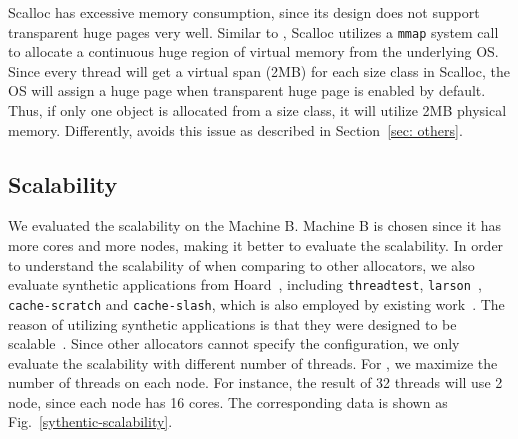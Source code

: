  Scalloc has excessive memory consumption, since its design does not support transparent huge pages very well. Similar to \NM{}, Scalloc utilizes a \texttt{mmap} system call to allocate a continuous huge region of virtual memory from the underlying OS. Since every thread will get a virtual span (2MB) for each size class in Scalloc, the OS will assign a huge page when transparent huge page is enabled by default. Thus, if only one object is allocated from a size class, it will utilize 2MB physical memory. Differently, \NM{} avoids this issue as described in Section~\ref{sec: others}.
 

\subsection{Scalability}
\label{sec:scale}

We evaluated the scalability on the Machine B. Machine B is chosen since it has more cores and more nodes, making it better to evaluate the scalability.  In order to understand the scalability of \NM{} when comparing to other allocators, we also evaluate synthetic applications from Hoard~\cite{Hoard}, including \texttt{threadtest}, \texttt{larson}~\cite{Larson}, \texttt{cache-scratch} and \texttt{cache-slash}, which is also employed by existing work~\cite{Scalloc}.  The reason of utilizing synthetic applications is that they were designed to be scalable~\cite{Scalloc}. Since other allocators cannot specify the configuration, we only evaluate the scalability with different number of threads. For \NM{}, we maximize the number of threads on each node. For instance, the result of 32 threads will use 2 node, since each node has 16 cores. The corresponding data is shown as Fig.~\ref{sythentic-scalability}. 


